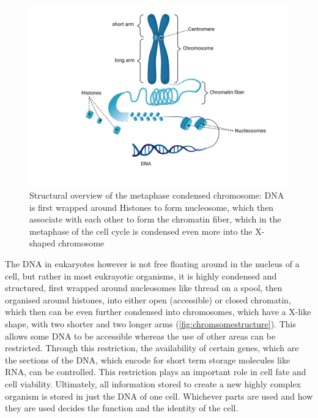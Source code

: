 \begin{figure}[!ht]
\centering
\includegraphics[width=0.9\linewidth]{Figures/intro/ChromosomeStructure}
\caption[Overview Chromosome structure]{Structural overview of the metaphase condensed chromosome: DNA is first wrapped around Histones to form nucleosome, which then associate with each other to form the chromatin fiber, which in the metaphase of the cell cycle is condensed even more into the X-shaped chromosome}\label{fig:chromsomestructure}
\end{figure}

The DNA in eukaryotes however is not free floating around in the nucleus of a cell, but rather in most eukrayotic organisms, it is highly condensed and structured, first wrapped around nucleosomes like thread on a spool, then organised around histones, into either open (accessible) or closed chromatin, which then can be even further condensed into chromosomes, which have a X-like shape, with two shorter and two longer arms (\autoref{fig:chromsomestructure}). This allows some DNA to be accessible whereas the use of other areas can be restricted\cite{Hammond2017}. Through this restriction, the availability of certain genes, which are the sections of the DNA, which encode for short term storage molecules like RNA, can be controlled. This restriction plays an important role in cell fate and cell viability. Ultimately, all information stored to create a new highly complex organism is stored in just the DNA of one cell. Whichever parts are used and how they are used decides the function and the identity of the cell\cite{Bonev2016}. 


